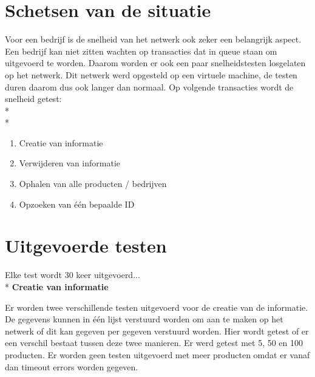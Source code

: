 \documentclass[fleqn,a4paper,12pt]{book}
\begin{document}
\section{Schetsen van de situatie}
Voor een bedrijf is de snelheid van het netwerk ook zeker een belangrijk aspect. Een bedrijf kan niet zitten wachten op transacties dat in queue staan om uitgevoerd te worden. Daarom worden er ook een paar snelheidstesten losgelaten op het netwerk. Dit netwerk werd opgesteld op een virtuele machine, de testen duren daarom dus ook langer dan normaal. Op volgende transacties wordt de snelheid getest:\\*\\*
\begin{enumerate}
	\item Creatie van informatie
	\item Verwijderen van informatie
	\item Ophalen van alle producten / bedrijven
	\item Opzoeken van één bepaalde ID
\end{enumerate}

\section{Uitgevoerde testen}
Elke test wordt 30 keer uitgevoerd...\\*
\textbf{Creatie van informatie}

Er worden twee verschillende testen uitgevoerd voor de creatie van de informatie. De gegevens kunnen in één lijst verstuurd worden om aan te maken op het netwerk of dit kan gegeven per gegeven verstuurd worden. Hier wordt getest of er een verschil bestaat tussen deze twee manieren. Er werd getest met 5, 50 en 100 producten. Er worden geen testen uitgevoerd met meer producten omdat er vanaf dan timeout errors worden gegeven.
\end{document}
